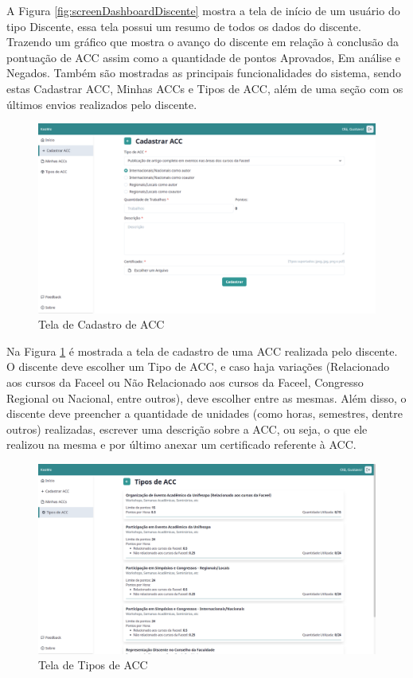 A Figura \ref{fig:screenDashboardDiscente} mostra a tela de início de um usuário do tipo Discente, essa tela possui um resumo de todos os dados do discente. Trazendo um gráfico que mostra o avanço do discente em relação à conclusão da pontuação de ACC assim como a quantidade de pontos Aprovados, Em análise e Negados. Também são mostradas as principais funcionalidades do sistema, sendo estas Cadastrar ACC, Minhas ACCs e Tipos de ACC, além de uma seção com os últimos envios realizados pelo discente.

\begin{figure}[H]
    \centering
    \includegraphics[width=\textwidth]{dados/figuras/Proposta/Screens/student_acc_request.png}
    \caption{Tela de Cadastro de ACC}
    \label{fig:screenCadastrarACC}
\end{figure}

Na Figura \ref{fig:screenCadastrarACC} é mostrada a tela de cadastro de uma ACC realizada pelo discente. O discente deve escolher um Tipo de ACC, e caso haja variações (Relacionado aos cursos da Faceel ou Não Relacionado aos cursos da Faceel, Congresso Regional ou Nacional, entre outros), deve escolher entre as mesmas. Além disso, o discente deve preencher a quantidade de unidades (como horas, semestres, dentre outros) realizadas, escrever uma descrição sobre a ACC, ou seja, o que ele realizou na mesma e por último anexar um certificado referente à ACC.

\begin{figure}[H]
    \centering
    \includegraphics[width=\textwidth]{dados/figuras/Proposta/Screens/student_acc_types.png}
    \caption{Tela de Tipos de ACC}
    \label{fig:screenTiposDeACC}
\end{figure}

